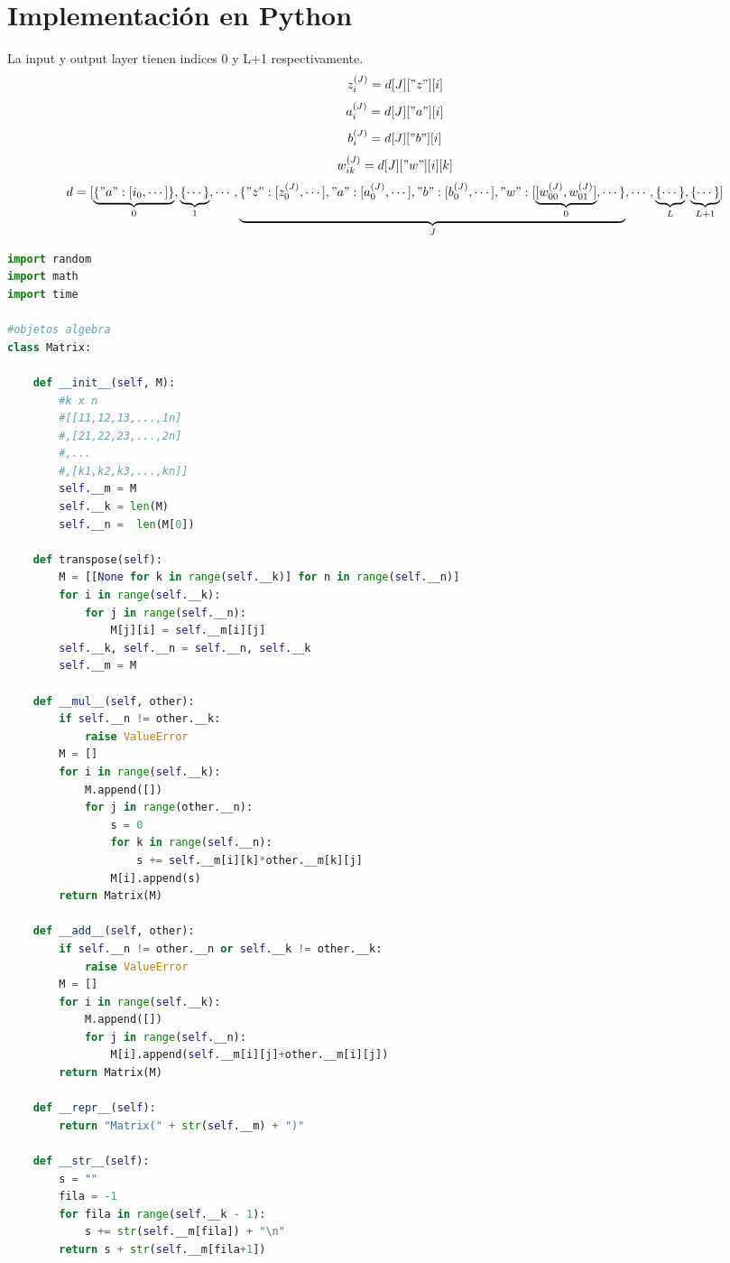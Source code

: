 \documentclass{article}
\begin{document}
\section{Implementación en Python}
La input y output layer tienen indices 0 y L+1 respectivamente.\\
$$
z_i^{(J)} = d[J]["z"][i]
$$
$$
a_i^{(J)} = d[J]["a"][i]
$$
$$
b_i^{(J)} = d[J]["b"][i]
$$
$$
w_{ik}^{(J)} = d[J]["w"][i][k]
$$
$$
d = [\underbrace{\{"a":[i_0, \cdots]\}}_0, \underbrace{\{\cdots\}}_1, \cdots, \underbrace{\{"z":[z_0^{(J)}, \cdots], "a":[a_0^{(J)}, \cdots], "b":[b_0^{(J)}, \cdots], "w":[\underbrace{[w_{00}^{(J)},w_{01}^{(J)}]}_0, \cdots\}}_J, \cdots, \underbrace{\{\cdots\}}_L, \underbrace{\{\cdots\}}_{L+1}]
$$
\begin{lstlisting}[language=Python]
import random
import math
import time

#objetos algebra
class Matrix:

    def __init__(self, M):
        #k x n
        #[[11,12,13,...,1n]
        #,[21,22,23,...,2n]
        #,...
        #,[k1,k2,k3,...,kn]]
        self.__m = M
        self.__k = len(M)
        self.__n =  len(M[0])

    def transpose(self):
        M = [[None for k in range(self.__k)] for n in range(self.__n)]
        for i in range(self.__k):
            for j in range(self.__n):
                M[j][i] = self.__m[i][j]
        self.__k, self.__n = self.__n, self.__k
        self.__m = M

    def __mul__(self, other):
        if self.__n != other.__k:
            raise ValueError
        M = []
        for i in range(self.__k):
            M.append([])
            for j in range(other.__n):
                s = 0
                for k in range(self.__n):
                    s += self.__m[i][k]*other.__m[k][j]
                M[i].append(s)
        return Matrix(M)

    def __add__(self, other):
        if self.__n != other.__n or self.__k != other.__k:
            raise ValueError
        M = []
        for i in range(self.__k):
            M.append([])
            for j in range(self.__n):
                M[i].append(self.__m[i][j]+other.__m[i][j])
        return Matrix(M)

    def __repr__(self):
        return "Matrix(" + str(self.__m) + ")"

    def __str__(self):
        s = ""
        fila = -1 
        for fila in range(self.__k - 1):
            s += str(self.__m[fila]) + "\n"
        return s + str(self.__m[fila+1])


\end{lstlisting}
\end{document}
